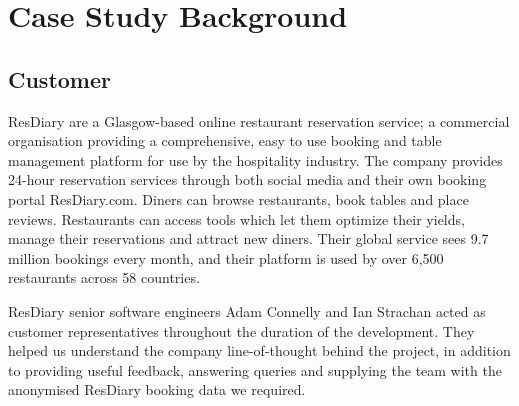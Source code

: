 \documentclass{l3proj}
\begin{document}
\newpage



\section{Case Study Background}
\label{sec:background}

\subsection{Customer}
\label{sec:customer}


ResDiary are a Glasgow-based online restaurant reservation service; a commercial organisation providing a comprehensive, easy to use booking and table management platform for use by the hospitality industry. The company provides 24-hour reservation services through both social media and their own booking portal ResDiary.com. Diners can browse restaurants, book tables and place reviews. Restaurants can access tools which let them optimize their yields, manage their reservations and attract new diners. Their global service sees 9.7 million bookings every month, and their platform is used by over 6,500 restaurants across 58 countries. 

ResDiary senior software engineers Adam Connelly and Ian Strachan acted as customer representatives throughout the duration of the development. They helped us understand the company line-of-thought behind the project, in addition to providing useful feedback, answering queries and supplying the team with the anonymised ResDiary booking data we required.
\end{document}
